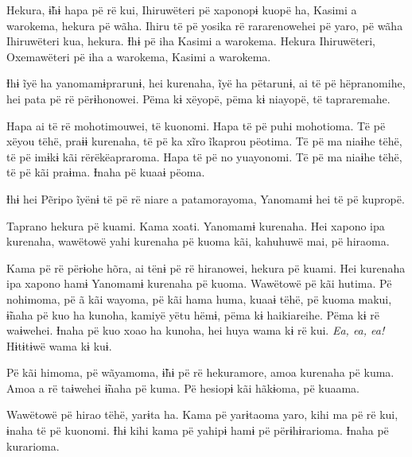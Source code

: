 Hekura, ɨ̃hɨ hapa pë rë kui, Ihiruwëteri pë xaponopɨ kuopë ha, Kasimi a
warokema, hekura pë wãha. Ihiru të pë yosika rë rararenowehei pë yaro,
pë wãha Ihiruwëteri kua, hekura. Ɨhɨ pë iha Kasimi a warokema. Hekura
Ihiruwëteri, Oxemawëteri pë iha a warokema, Kasimi a warokema. 


Ɨhɨ ĩyë ha yanomamɨprarunɨ, hei kurenaha, ĩyë ha pëtarunɨ, ai të pë
hëpranomihe, hei pata pë rë përɨhonowei. Pëma kɨ xëyopë, pëma kɨ
niayopë, të tapraremahe. 

Hapa ai të rë mohotimouwei, të kuonomi. Hapa të pë puhi mohotioma. Të pë
xëyou tëhë, praɨɨ kurenaha, të pë ka xĩro ĩkaprou pëotima. Të pë ma
niaɨhe tëhë, të pë imɨkɨ kãi rërëkëapraroma. Hapa të pë no yuayonomi. Të
pë ma niaɨhe tëhë, të pë kãi praɨma. Ɨnaha pë kuaaɨ pëoma. 

Ɨhɨ hei Pẽripo ĩyënɨ të pë rë niare a patamorayoma, Yanomamɨ hei të pë
kupropë.  


Taprano hekura pë kuami. Kama xoati. Yanomamɨ kurenaha. Hei xapono ipa
kurenaha, wawëtowë yahi kurenaha pë kuoma kãi, kahuhuwë mai, pë
hiraoma. 

Kama pë rë përɨohe hõra, ai tënɨ pë rë hiranowei, hekura pë kuami. Hei
kurenaha ipa xapono hamɨ Yanomamɨ kurenaha pë kuoma. Wawëtowë pë kãi
hutima. Pë nohimoma, pë ã kãi wayoma, pë kãi hama huma, kuaaɨ tëhë, pë
kuoma makui, ɨ̃naha pë kuo ha kunoha, kamiyë yëtu hëmɨ, pëma kɨ
haikiareihe. Pëma kɨ rë waɨwehei. Ɨnaha pë kuo xoao ha kunoha, hei huya
wama kɨ rë kui. \textit{Ea, ea, ea!} Hɨtɨtɨwë wama kɨ kuɨ. 


Pë kãi himoma, pë wãyamoma, ɨ̃hɨ pë rë hekuramore, amoa kurenaha pë kuma.
Amoa a rë taɨwehei ɨ̃naha pë kuma. Pë hesiopɨ kãi hãkɨoma, pë kuaama. 

Wawëtowë pë hirao tëhë, yarɨta ha. Kama pë yarɨtaoma yaro, kihi ma pë rë
kui, ɨnaha të pë kuonomi. Ɨhɨ kihi kama pë yahipɨ hamɨ pë përɨhɨrarioma.
Ɨnaha pë kurarioma. 

